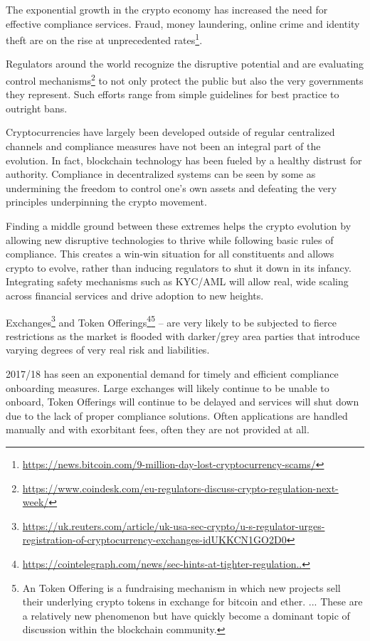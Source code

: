 \documentclass[12pt]{article}
\begin{document}
The exponential growth in the crypto economy has increased the need for effective compliance services. Fraud, money laundering, online crime and identity theft are on the rise at unprecedented rates\footnote{\url{https://news.bitcoin.com/9-million-day-lost-cryptocurrency-scams/}}. 

Regulators around the world recognize the disruptive potential and are evaluating control mechanisms\footnote{\url{https://www.coindesk.com/eu-regulators-discuss-crypto-regulation-next-week/}} to not only protect the public but also the very governments they represent. Such efforts range from simple guidelines for best practice to outright bans. 

Cryptocurrencies have largely been developed outside of regular centralized channels and compliance measures have not been an integral part of the evolution. In fact, blockchain technology has been fueled by a healthy distrust for authority. Compliance in decentralized systems can be seen by some as undermining the freedom to control one’s own assets and defeating the very principles underpinning the crypto movement. 

Finding a middle ground between these extremes helps the crypto evolution by allowing new disruptive technologies to thrive while following basic rules of compliance. This creates a win-win situation for all constituents and allows crypto to evolve, rather than inducing regulators to shut it down in its infancy. Integrating safety mechanisms such as KYC/AML will allow real, wide scaling across financial services and drive adoption to new heights. 

Exchanges\footnote{\url{https://uk.reuters.com/article/uk-usa-sec-crypto/u-s-regulator-urges-registration-of-cryptocurrency-exchanges-idUKKCN1GO2D0}} and Token Offerings\footnote{\href{https://cointelegraph.com/news/sec-hints-at-tighter-regulation-for-icos-smart-policies-for-true-cryptocurrencies}{https://cointelegraph.com/news/sec-hints-at-tighter-regulation..}}\footnote{An Token Offering is a fundraising mechanism in which new projects sell their underlying crypto tokens in exchange for bitcoin and ether. ... These are a relatively new phenomenon but have quickly become a dominant topic of discussion within the blockchain community.} – are very likely to be subjected to fierce restrictions as the market is flooded with darker/grey area parties that introduce varying degrees of very real risk and liabilities. 

2017/18 has seen an exponential demand for timely and efficient compliance onboarding measures.  Large exchanges will likely continue to be unable to onboard, Token Offerings will continue to be delayed and services will shut down due to the lack of proper compliance solutions. Often applications are handled manually and with exorbitant fees, often they are not provided at all.  
\end{document}
